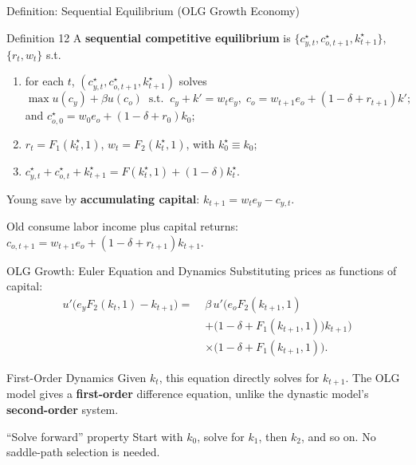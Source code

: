 \documentclass[aspectratio=169,10pt]{beamer}
\newcommand{\apxbutton}[1]{\hfill\hyperlink{#1}{\beamerbutton{Appendix}}}
\begin{document}
\begin{frame}{Definition: Sequential Equilibrium (OLG Growth Economy)}
\hypertarget{m-a11}{}
\begin{block}{Definition 12}
A \textbf{sequential competitive equilibrium} is $\{c_{y,t}^\star, c_{o,t+1}^\star, k_{t+1}^\star\}$, $\{r_t, w_t\}$ s.t.
\begin{enumerate}
  \item for each $t$, $(c_{y,t}^\star, c_{o,t+1}^\star, k_{t+1}^\star)$ solves
  \[
  \max u(c_y)+\beta u(c_o) \;\;\text{s.t.}\;\; c_y+k'=w_t e_y, \; c_o = w_{t+1}e_o+(1-\delta+r_{t+1})k';
  \]
  and $c_{o,0}^\star = w_0 e_o+(1-\delta+r_0)k_0$;
  \item $r_t=F_1(k_t^\star,1)$, $w_t=F_2(k_t^\star,1)$, with $k_0^\star\equiv k_0$;
  \item $c_{y,t}^\star+c_{o,t}^\star+k_{t+1}^\star=F(k_t^\star,1)+(1-\delta)k_t^\star$.
\end{enumerate}
\end{block}

\medskip
Young save by \textbf{accumulating capital}: $k_{t+1}=w_t e_y - c_{y,t}$.

Old consume labor income plus capital returns: $c_{o,t+1}=w_{t+1}e_o+(1-\delta+r_{t+1})k_{t+1}$.
\end{frame}

\begin{frame}{OLG Growth: Euler Equation and Dynamics}
\small
Substituting prices as functions of capital:
\[
\begin{aligned}
u'\big(e_yF_2(k_t,1)-k_{t+1}\big)
=\;& \beta\,u'\big(e_oF_2(k_{t+1},1) \\
&+\big(1-\delta+F_1(k_{t+1},1)\big)k_{t+1}\big) \\
&\times \big(1-\delta+F_1(k_{t+1},1)\big).
\end{aligned}
\]
\normalsize

\begin{block}{First-Order Dynamics}
Given $k_t$, this equation directly solves for $k_{t+1}$. The OLG model gives a \textbf{first-order} difference equation, unlike the dynastic model's \textbf{second-order} system.
\end{block}

\begin{block}{``Solve forward'' property}
Start with $k_0$, solve for $k_1$, then $k_2$, and so on. No saddle-path selection is needed.
\end{block}
\apxbutton{a11}
\end{frame}
\end{document}

